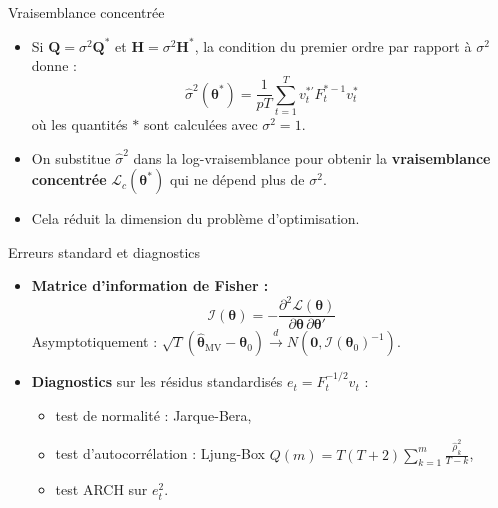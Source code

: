 \documentclass[11pt,aspectratio=169]{beamer}
\begin{document}
\begin{frame}{Vraisemblance concentrée}

\begin{itemize}

\item Si $\bm{Q} = \sigma^2 \bm{Q}^*$ et $\bm{H} = \sigma^2 \bm{H}^*$, la condition du premier ordre par rapport à $\sigma^2$ donne :
  \[
  \hat{\sigma}^2(\bm{\theta}^*) = \frac{1}{pT} \sum_{t=1}^{T} v_t^{*\prime} F_t^{*-1} v_t^*
  \]
  où les quantités $*$ sont calculées avec $\sigma^2 = 1$.\newline

\item On substitue $\hat{\sigma}^2$ dans la log-vraisemblance pour obtenir la \textbf{vraisemblance concentrée} $\mathcal{L}_c(\bm{\theta}^*)$ qui ne dépend plus de $\sigma^2$.\newline

\item Cela réduit la dimension du problème d'optimisation.

\end{itemize}

\end{frame}

\begin{frame}{Erreurs standard et diagnostics}

\begin{itemize}

\item \textbf{Matrice d'information de Fisher :}
  \[
  \mathcal{I}(\bm{\theta}) = -\frac{\partial^2 \mathcal{L}(\bm{\theta})}{\partial \bm{\theta}\, \partial \bm{\theta}'}
  \]
  Asymptotiquement : $\sqrt{T}(\hat{\bm{\theta}}_{\mathrm{MV}} - \bm{\theta}_0) \xrightarrow{d} N(\bm{0}, \mathcal{I}(\bm{\theta}_0)^{-1})$.\newline

\item \textbf{Diagnostics} sur les résidus standardisés $e_t = F_t^{-1/2} v_t$ :
  \begin{itemize}
  \item test de normalité : Jarque-Bera,
  \item test d'autocorrélation : Ljung-Box $Q(m) = T(T+2)\sum_{k=1}^m \frac{\hat{\rho}_k^2}{T-k}$,
  \item test ARCH sur $e_t^2$.
  \end{itemize}

\end{itemize}

\end{frame}
\end{document}
